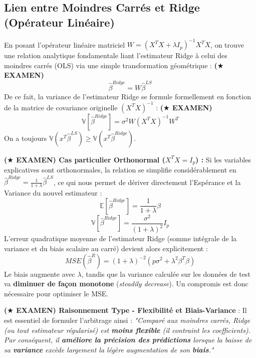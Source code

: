 \subsection{Lien entre Moindres Carrés et Ridge (Opérateur Linéaire)}

En posant l'opérateur linéaire matriciel $W = (X^T X + \lambda I_p)^{-1} X^T X$, on trouve une relation analytique fondamentale liant l'estimateur Ridge à celui des moindres carrés (OLS) via une simple transformation géométrique :
\textbf{($\bigstar$ EXAMEN)}
\begin{equation}
\hat{\beta}^{Ridge} = W \hat{\beta}^{LS}
\end{equation}
De ce fait, la variance de l'estimateur Ridge se formule formellement en fonction de la matrice de covariance originelle $(X^T X)^{-1}$ :
\textbf{($\bigstar$ EXAMEN)}
\begin{equation}
\mathbb{V}[\hat{\beta}^{Ridge}] = \sigma^2 W (X^T X)^{-1} W^T
\end{equation}
On a toujours $\mathbb{V}(x^T \hat{\beta}^{LS}) \ge \mathbb{V}(x^T \hat{\beta}^{Ridge})$. 

\textbf{($\bigstar$ EXAMEN) Cas particulier Orthonormal ($X^T X = I_p$) :} 
Si les variables explicatives sont orthonormales, la relation se simplifie considérablement en $\hat{\beta}^{Ridge} = \frac{1}{1+\lambda} \hat{\beta}^{LS}$, ce qui nous permet de dériver directement l'Espérance et la Variance du nouvel estimateur :
\begin{equation}
\mathbb{E}[\hat{\beta}^{Ridge}] = \frac{1}{1+\lambda} \beta
\end{equation}
\begin{equation}
\mathbb{V}[\hat{\beta}^{Ridge}] = \frac{\sigma^2}{(1+\lambda)^2} I_p
\end{equation}
L'erreur quadratique moyenne de l'estimateur Ridge (somme intégrale de la variance et du biais scalaire au carré) devient alors explicitement :
\begin{equation}
MSE(\hat{\beta}^R) = (1+\lambda)^{-2}(p\sigma^2 + \lambda^2 \beta^T \beta)
\end{equation}
Le biais augmente avec $\lambda$, tandis que la variance calculée sur les données de test va \textbf{diminuer de façon monotone} (\textit{steadily decrease}). Un compromis est donc nécessaire pour optimiser le MSE.

\textbf{($\bigstar$ EXAMEN) Raisonnement Type - Flexibilité et Biais-Variance} : 
Il est essentiel de formuler l'arbitrage ainsi : \textit{"Comparé aux moindres carrés, Ridge (ou tout estimateur régularisé) est \textbf{moins flexible} (il contraint les coefficients). Par conséquent, il \textbf{améliore la précision des prédictions} lorsque la baisse de sa \textbf{variance} excède largement la légère augmentation de son \textbf{biais}."} 

